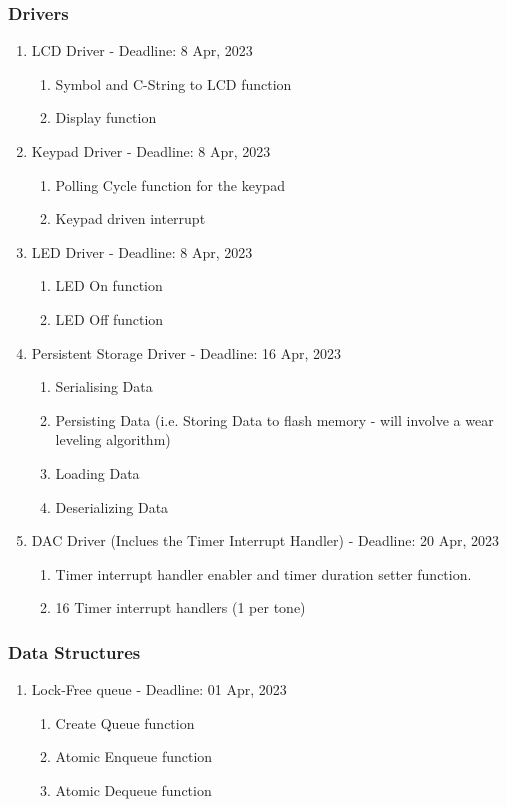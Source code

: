 \documentclass[11pt,a4paper,twocolumn]{scrartcl}
\begin{document}
\subsubsection{Drivers}
\begin{enumerate}
    \item LCD Driver - Deadline: 8 Apr, 2023
    \begin{enumerate}
        \item Symbol and C-String to LCD function
        \item Display function
    \end{enumerate}
    \item Keypad Driver - Deadline: 8 Apr, 2023
    \begin{enumerate}
        \item Polling Cycle function for the keypad
        \item Keypad driven interrupt
    \end{enumerate}
    \item LED Driver - Deadline: 8 Apr, 2023
    \begin{enumerate}
        \item LED On function
        \item LED Off function
    \end{enumerate}
    \item Persistent Storage Driver - Deadline: 16 Apr, 2023
    \begin{enumerate}
        \item Serialising Data
        \item Persisting Data (i.e. Storing Data to flash memory - will involve a wear leveling algorithm)
        \item Loading Data
        \item Deserializing Data
    \end{enumerate}
    \item DAC Driver (Inclues the Timer Interrupt Handler) - Deadline: 20 Apr, 2023
    \begin{enumerate}
        \item Timer interrupt handler enabler and timer duration setter function.
        \item 16 Timer interrupt handlers (1 per tone)
    \end{enumerate}
\end{enumerate}

\subsubsection{Data Structures}
\begin{enumerate}
    \item Lock-Free queue - Deadline: 01 Apr, 2023
    \begin{enumerate}
        \item Create Queue function
        \item Atomic Enqueue function
        \item Atomic Dequeue function
    \end{enumerate}
\end{enumerate}
\end{document}
